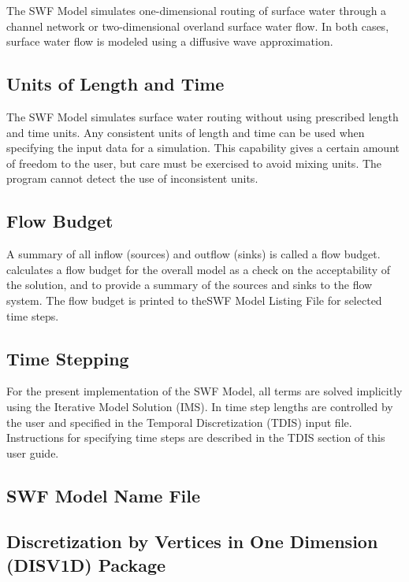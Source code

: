 The SWF Model simulates one-dimensional routing of surface water through a channel network or two-dimensional overland surface water flow.  In both cases, surface water flow is modeled using a diffusive wave approximation.

\subsection{Units of Length and Time}
The SWF Model simulates surface water routing without using prescribed length and time units. Any consistent units of length and time can be used when specifying the input data for a simulation. This capability gives a certain amount of freedom to the user, but care must be exercised to avoid mixing units.  The program cannot detect the use of inconsistent units.

\subsection{Flow Budget}
A summary of all inflow (sources) and outflow (sinks) is called a flow budget.  \mf calculates a flow budget for the overall model as a check on the acceptability of the solution, and to provide a summary of the sources and sinks to the flow system.  The flow budget is printed to theSWF Model Listing File for selected time steps.

\subsection{Time Stepping}

For the present implementation of the SWF Model, all terms are solved implicitly using the Iterative Model Solution (IMS).  In \mf time step lengths are controlled by the user and specified in the Temporal Discretization (TDIS) input file.  Instructions for specifying time steps are described in the TDIS section of this user guide.  

\newpage
\subsection{SWF Model Name File}


\newpage
\subsection{Discretization by Vertices in One Dimension (DISV1D) Package}


